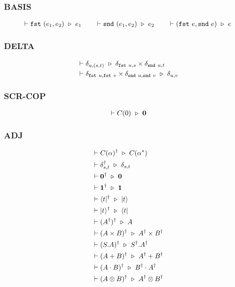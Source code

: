 

\subsubsection*{\textsf{BASIS}}
\begin{align*}
    \vdash \texttt{fst}\ (e_1, e_2) \ \triangleright\  e_1
    \qquad
    \vdash \texttt{snd}\ (e_1, e_2) \ \triangleright\  e_2
    \qquad
    \vdash (\texttt{fst}\ e, \texttt{snd}\ e)\ \triangleright\  e
\end{align*}

\subsubsection*{\textsf{DELTA}}
\begin{align*}
  & \vdash \delta_{u, (s, t)} \ \triangleright\  \delta_{\texttt{fst}\ u, s} \times \delta_{\texttt{snd}\ u, t} \\
  & \vdash \delta_{\texttt{fst}\ u, \texttt{fst}\ v}\times\delta_{\texttt{snd}\ u, \texttt{snd}\ v} \ \triangleright\  \delta_{u, v}
\end{align*}


\subsubsection*{\textsf{SCR-COP}}
\begin{align*}
  & \vdash C(0) \ \triangleright\  \mathbf{0} \\
\end{align*}


\subsubsection*{\textsf{ADJ}}
\begin{align*}
  & \vdash C(\alpha)^\dagger \ \triangleright\  C(\alpha^*) \\
  & \vdash \delta_{s, t}^\dagger \ \triangleright\  \delta_{s, t} \\
  & \vdash \textbf{0}^\dagger \ \triangleright\  \textbf{0} \\
  & \vdash \mathbf{1}^\dagger \ \triangleright\  \mathbf{1} \\
  & \vdash \langle t|^\dagger \ \triangleright\  |t\rangle\\
  & \vdash |t\rangle^\dagger \ \triangleright\  \langle t|\\
  & \vdash (A^\dagger)^\dagger \ \triangleright\  A \\
  & \vdash (A \times B)^\dagger \ \triangleright\  A^\dagger \times B^\dagger \\
  & \vdash (S.A)^\dagger \ \triangleright\  S^\dagger . A^\dagger \\
  & \vdash (A + B)^\dagger \ \triangleright\  A^\dagger + B^\dagger\\
  & \vdash (A \cdot B)^\dagger \ \triangleright\  B^\dagger \cdot A^\dagger \\
  & \vdash (A \otimes B)^\dagger \ \triangleright\  A^\dagger \otimes B^\dagger
\end{align*}


